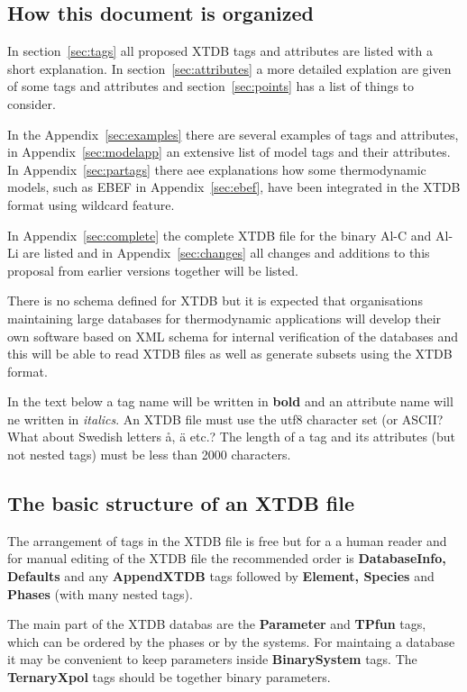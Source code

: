 \documentclass{article}
\begin{document}
\subsection{How this document is organized}

In section~\ref{sec:tags} all proposed XTDB tags and attributes are
listed with a short explanation.  In section~\ref{sec:attributes} a
more detailed explation are given of some tags and attributes and
section~\ref{sec:points} has a list of things to consider.

In the Appendix~\ref{sec:examples} there are several examples of tags
and attributes, in Appendix~\ref{sec:modelapp} an extensive list of
model tags and their attributes.  In Appendix~\ref{sec:partags} there
aee explanations how some thermodynamic models, such as EBEF in
Appendix~\ref{sec:ebef}, have been integrated in the XTDB format using
wildcard feature.

In Appendix~\ref{sec:complete} the complete XTDB file for the binary
Al-C and Al-Li are listed and in Appendix~\ref{sec:changes} all
changes and additions to this proposal from earlier versions together
will be listed.

There is no schema defined for XTDB but it is expected that
organisations maintaining large databases for thermodynamic
applications will develop their own software based on XML schema for
internal verification of the databases and this will be able to read
XTDB files as well as generate subsets using the XTDB format.

In the text below a tag name will be written in {\bf bold} and an
attribute name will ne written in {\em italics}.  An XTDB file must
use the utf8 character set (or ASCII? What about Swedish letters
{\aa}, {\"a} etc.?  The length of a tag and its attributes (but not
  nested tags) must be less than 2000 characters.

\subsection{The basic structure of an XTDB file}

The arrangement of tags in the XTDB file is free but for a a human
reader and for manual editing of the XTDB file the recommended order
is {\bf DatabaseInfo, Defaults} and any {\bf AppendXTDB} tags followed
by {\bf Element, Species} and {\bf Phases} (with many nested tags).

The main part of the XTDB databas are the {\bf Parameter} and {\bf
  TPfun} tags, which can be ordered by the phases or by the systems.
For maintaing a database it may be convenient to keep parameters
inside {\bf BinarySystem} tags.  The {\bf TernaryXpol} tags should be
together binary parameters.
\end{document}
